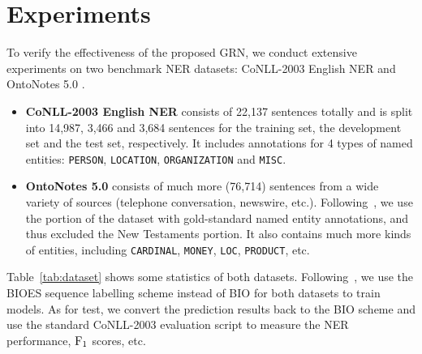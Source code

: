 \documentclass[letterpaper]{article} \usepackage{aaai19}  \usepackage{times}  \usepackage{helvet}  \usepackage{courier}  \usepackage{url}  \usepackage{graphicx}  \usepackage{amsmath}
\newcommand{\ie}{\text{i.e.,}}
\newcommand{\GRN}{GRN}
\begin{document}
\section{Experiments}
To verify the effectiveness of the proposed \GRN{}, we conduct extensive experiments on two benchmark NER datasets: CoNLL-2003 English NER \cite{tjong2003introduction} and OntoNotes 5.0 \cite{hovy2006ontonotes,pradhan2013towards}.
\begin{itemize}
\item \textbf{CoNLL-2003 English NER} consists of 22,137 sentences totally and is split into 14,987, 3,466 and 3,684 sentences for the training set, the development set and the test set, respectively. It includes annotations for 4 types of named entities: \texttt{PERSON}, \texttt{LOCATION}, \texttt{ORGANIZATION} and \texttt{MISC}. \item \textbf{OntoNotes 5.0} consists of much more (76,714) sentences  from a wide variety of sources (telephone conversation, newswire, etc.). Following~\cite{chiu2016named}, we use the portion of the dataset with gold-standard named entity annotations, and thus excluded the New Testaments portion. It also contains much more kinds of entities, including \texttt{CARDINAL}, \texttt{MONEY}, \texttt{LOC}, \texttt{PRODUCT}, etc.
\end{itemize}
Table~\ref{tab:dataset} shows some statistics of both datasets. Following~\cite{ma2016CNNBLSTMCRF}, we use the BIOES sequence labelling scheme instead of BIO for both datasets to train models. As for test, we convert the prediction results back to the BIO scheme and use the standard CoNLL-2003 evaluation script to measure the NER performance, \ie{} $\rm F_1$ scores, etc.

\begin{table}[t!]
  \centering
    \begin{adjustbox}{max width=0.8\columnwidth}
    \end{adjustbox}
    \caption{Statistics of CoNLL-2003 and Ontonotes 5.0.}
    \label{tab:dataset}
\end{table}
\end{document}
